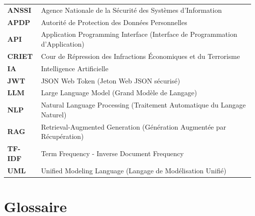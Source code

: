 \documentclass{ifri}
\begin{document}
\begin{center}
\begin{longtable}{p{3cm} p{11cm}}

\textbf{ANSSI} & Agence Nationale de la Sécurité des Systèmes d'Information \\[0.4em]

\textbf{APDP} & Autorité de Protection des Données Personnelles \\[0.4em]

\textbf{API} & Application Programming Interface (Interface de Programmation d'Application) \\[0.4em]

\textbf{CRIET} & Cour de Répression des Infractions Économiques et du Terrorisme \\[0.4em]

\textbf{IA} & Intelligence Artificielle \\[0.4em]

\textbf{JWT} & JSON Web Token (Jeton Web JSON sécurisé) \\[0.4em]

\textbf{LLM} & Large Language Model (Grand Modèle de Langage) \\[0.4em]

\textbf{NLP} & Natural Language Processing (Traitement Automatique du Langage Naturel) \\[0.4em]

\textbf{RAG} & Retrieval-Augmented Generation (Génération Augmentée par Récupération) \\[0.4em]

\textbf{TF-IDF} & Term Frequency - Inverse Document Frequency \\[0.4em]

\textbf{UML} & Unified Modeling Language (Langage de Modélisation Unifié) \\[0.4em]

\end{longtable}
\end{center}

\newpage

\cleardoublepage
\chapter*{Glossaire}
\end{document}
